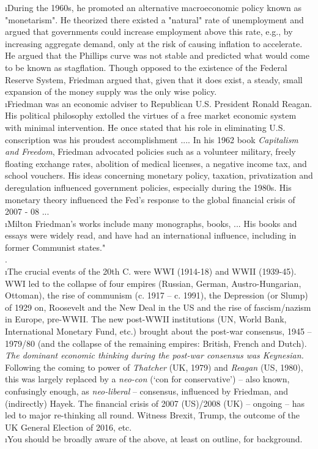 \documentclass[12pt]{article}
\begin{document}
\i During the 1960s, he promoted an alternative macroeconomic policy known as "monetarism". He theorized there existed a "natural" rate of unemployment and argued that governments could increase employment above this rate, e.g., by increasing aggregate demand, only at the risk of causing inflation to accelerate. He argued that the Phillips curve was not stable and predicted what would come to be known as stagflation. Though opposed to the existence of the Federal Reserve System, Friedman argued that, given that it does exist, a steady, small expansion of the money supply was the only wise policy. \\
\i Friedman was an economic adviser to Republican U.S. President Ronald Reagan. His political philosophy extolled the virtues of a free market economic system with minimal intervention. He once stated that his role in eliminating U.S. conscription was his proudest accomplishment .... In his 1962 book {\sl Capitalism and Freedom}, Friedman advocated policies such as a volunteer military, freely floating exchange rates, abolition of medical licenses, a negative income tax, and school vouchers. His ideas concerning monetary policy, taxation, privatization and deregulation influenced government policies, especially during the 1980s. His monetary theory influenced the Fed's response to the global financial crisis of 2007 - 08 ... \\
\i Milton Friedman's works include many monographs, books, ...  His books and essays were widely read, and have had an international influence, including in former Communist states." \\

. \\
\i The crucial events of the 20th C. were WWI (1914-18) and WWII (1939-45).  WWI led to the collapse of four empires (Russian, German, Austro-Hungarian, Ottoman), the rise of communism (c. 1917 -- c. 1991), the Depression (or Slump) of 1929 on, Roosevelt and the New Deal in the US and the rise of fascism/nazism in Europe, pre-WWII.  The new post-WWII institutions (UN, World Bank, International Monetary Fund, etc.) brought about the post-war consensus, 1945 -- 1979/80 (and the collapse of the remaining empires: British, French and Dutch).  {\it The dominant economic thinking during the post-war consensus was Keynesian.}  Following the coming to power of {\it Thatcher} (UK, 1979) and {\it Reagan} (US, 1980), this was largely replaced by a {\it neo-con} (`con for conservative') -- also known, confusingly enough, as {\it neo-liberal} -- consensus, influenced by Friedman, and (indirectly) Hayek.  The financial crisis of 2007 (US)/2008 (UK) -- ongoing -- has led to major re-thinking all round.  Witness Brexit, Trump, the outcome of the UK General Election of 2016, etc. \\
\i You should be broadly aware of the above, at least on outline, for background. \\
\end{document}
